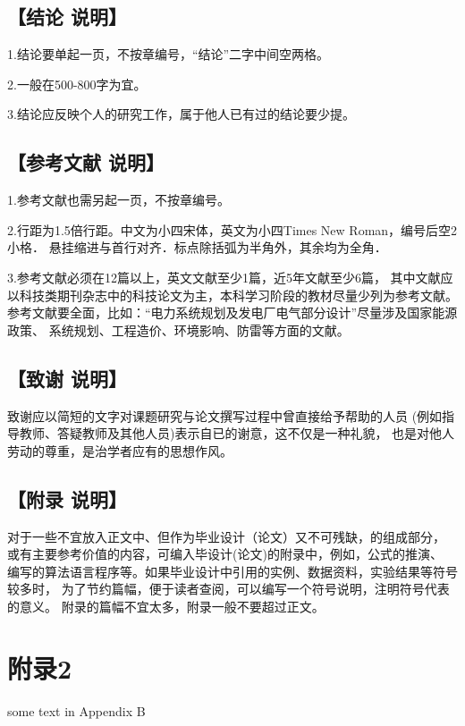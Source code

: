 \begin{appendices}
    \subsection*{【结论 说明】}
    1.结论要单起一页，不按章编号，“结论”二字中间空两格。

    2.一般在500-800字为宜。

    3.结论应反映个人的研究工作，属于他人已有过的结论要少提。

    \subsection*{【参考文献 说明】}
    1.参考文献也需另起一页，不按章编号。

    2.行距为1.5倍行距。中文为小四宋体，英文为小四Times New Roman，编号后空2小格．
    悬挂缩进与首行对齐．标点除括弧为半角外，其余均为全角．

    3.参考文献必须在12篇以上，英文文献至少1篇，近5年文献至少6篇，
    其中文献应以科技类期刊杂志中的科技论文为主，本科学习阶段的教材尽量少列为参考文献。
    参考文献要全面，比如：“电力系统规划及发电厂电气部分设计”尽量涉及国家能源政策、
    系统规划、工程造价、环境影响、防雷等方面的文献。

    \subsection*{【致谢 说明】}
    致谢应以简短的文字对课题研究与论文撰写过程中曾直接给予帮助的人员
    (例如指导教师、答疑教师及其他人员)表示自已的谢意，这不仅是一种礼貌，
    也是对他人劳动的尊重，是治学者应有的思想作风。
    \subsection*{【附录 说明】}
    对于一些不宜放入正文中、但作为毕业设计（论文）又不可残缺，的组成部分，
    或有主要参考价值的内容，可编入毕设计(论文)的附录中，例如，公式的推演、
    编写的算法语言程序等。如果毕业设计中引用的实例、数据资料，实验结果等符号较多时，
    为了节约篇幅，便于读者查阅，可以编写一个符号说明，注明符号代表的意义。
    附录的篇幅不宜太多，附录一般不要超过正文。


    \section*{附录2  }
    some text in Appendix B


\end{appendices}
